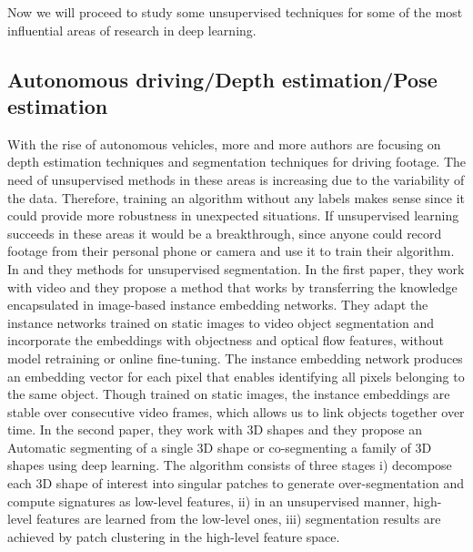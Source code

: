 \documentclass[letterpaper, 10 pt, conference]{ieeeconf}  %
\begin{document}
Now we will proceed to study some unsupervised techniques for some of the most influential areas of research in deep learning.

\subsection{Autonomous driving/Depth estimation/Pose estimation}

With the rise of autonomous vehicles, more and more authors are focusing on depth estimation techniques and segmentation techniques for driving footage. The need of unsupervised methods in these areas is increasing due to the variability of the data. Therefore, training an algorithm without any labels makes sense since it could provide more robustness in unexpected situations. If unsupervised learning succeeds in these areas it would be a breakthrough, since anyone could record footage from their personal phone or camera and use it to train their algorithm. In \cite{Li_2018_CVPR} and  \cite{shu_unsupervised_2016} they methods for unsupervised segmentation. In the first paper, they work with video and they propose a method that works by transferring the knowledge encapsulated in image-based instance embedding networks. They adapt the instance networks trained on static images to video object segmentation and incorporate the embeddings with objectness and optical flow features, without model retraining or online fine-tuning. The instance embedding network produces an embedding vector for each pixel that enables identifying all pixels belonging to the same object. Though trained on static images, the instance embeddings are stable over consecutive video frames, which allows us to link objects together over time. In the second paper, they work with 3D shapes and they propose an Automatic segmenting of a single 3D shape or co-segmenting a family of 3D shapes using deep learning. The algorithm consists of three stages i) decompose each 3D shape of interest into singular patches to generate over-segmentation and compute signatures as low-level features, ii) in an unsupervised manner, high-level features are learned from the low-level ones, iii) segmentation results are achieved by patch clustering in the high-level feature space. 
\end{document}
